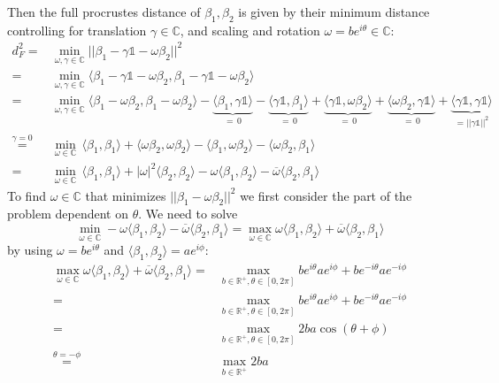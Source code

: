 Then the full procrustes distance of $\beta_1, \beta_2$ is given by their minimum distance controlling for translation $\gamma \in \mathbb{C}$, and scaling and rotation $\omega = b e^{i\theta} \in \mathbb{C}$:
\begin{align*}
d_F^2 =& \min_{\omega,\gamma \in \mathbb{C}} ||\beta_1 - \gamma \mathbb{1} - \omega \beta_2 ||^2 \\
  =& \min_{\omega,\gamma \in \mathbb{C}} \langle\beta_1 - \gamma \mathbb{1} - \omega \beta_2, \beta_1 - \gamma \mathbb{1} - \omega \beta_2 \rangle \\
  =& \min_{\omega,\gamma \in \mathbb{C}}
    \langle \beta_1 - \omega \beta_2, \beta_1 - \omega \beta_2 \rangle
    - \underbrace{\langle \beta_1, \gamma \mathbb{1} \rangle}_{=\,0}
    - \underbrace{\langle \gamma \mathbb{1}, \beta_1 \rangle}_{=\,0}
    + \underbrace{\langle \gamma \mathbb{1}, \omega \beta_2 \rangle}_{=\,0}
    + \underbrace{\langle \omega \beta_2, \gamma \mathbb{1} \rangle}_{=\,0}
    + \underbrace{\langle \gamma \mathbb{1}, \gamma \mathbb{1} \rangle}_{=||\gamma \mathbb{1}||^2} \\
  \stackrel{\gamma=0}{=}& \min_{\omega \in \mathbb{C}}\,
    \langle \beta_1, \beta_1 \rangle 
    + \langle \omega \beta_2, \omega \beta_2 \rangle
    - \langle \beta_1, \omega \beta_2 \rangle
    - \langle \omega \beta_2, \beta_1 \rangle \\
  =& \min_{\omega \in \mathbb{C}}\,
    \langle \beta_1, \beta_1 \rangle 
    + |\omega|^2 \langle \beta_2, \beta_2 \rangle
    - \omega \langle \beta_1, \beta_2 \rangle
    - \overline{\omega} \langle \beta_2, \beta_1 \rangle
\end{align*}
To find $\omega \in \mathbb{C}$ that minimizes $||\beta_1 - \omega \beta_2||^2$ we first consider the part of the problem dependent on $\theta$. We need to solve
$$ \min_{\omega \in \mathbb{C}} 
  - \omega \langle \beta_1, \beta_2 \rangle
  - \overline{\omega} \langle \beta_2, \beta_1 \rangle  = 
\max_{\omega \in \mathbb{C}}
  \omega \langle \beta_1, \beta_2 \rangle
  + \overline{\omega} \langle \beta_2, \beta_1 \rangle $$
by using $\omega = b e^{i\theta}$ and $\langle \beta_1, \beta_2 \rangle = a e^{i\phi}$:
\begin{align*}
\max_{\omega \in \mathbb{C}}
  \omega \langle \beta_1, \beta_2 \rangle
  + \overline{\omega} \langle \beta_2, \beta_1 \rangle
=& \max_{b \in \mathbb{R}^+, \theta \in [0,2\pi]}
  b e^{i\theta} a e^{i\phi} + b e^{-i\theta} a e^{-i\phi} \\
=& \max_{b \in \mathbb{R}^+, \theta \in [0,2\pi]}
  b e^{i\theta} a e^{i\phi} + b e^{-i\theta} a e^{-i\phi} \\
=& \max_{b \in \mathbb{R}^+, \theta \in [0,2\pi]}
 2 b a \cos\left(\theta +\phi\right)\\
\stackrel{\theta = -\phi}{=}& \max_{b \in \mathbb{R}^+}
 2 b a 
\end{align*}
